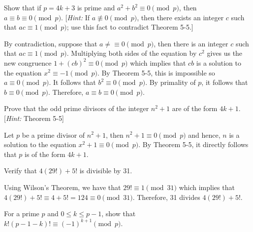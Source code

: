 \begin{exercise}
    Show that if $p = 4k + 3$ is prime and $a^2 + b^2 \equiv 0 \pmod p$, then $a\equiv b \equiv 0 \pmod p$. [\textit{Hint:} If $a \not\equiv 0 \pmod p$, then there exists an integer $c$ such that $ac \equiv 1 \pmod p$; use this fact to contradict Theorem 5-5.] \\
\end{exercise}

\begin{solution}
    By contradiction, suppose that $a\neq\equiv 0 \pmod{p}$, then there is an integer $c$ such that $ac \equiv 1 \pmod{p}$. Multiplying both sides of the equation by $c^2$ gives us the new congruence $1 + (cb)^2 \equiv 0 \pmod{p}$ which implies that $cb$ is a solution to the equation $x^2 \equiv -1 \pmod{p}$. By Theorem 5-5, this is impossible so $a \equiv 0 \pmod p$. It follows that $b^2 \equiv 0 \pmod p$. By primality of $p$, it follows that $b \equiv 0 \pmod p$. Therefore, $a\equiv b \equiv 0 \pmod p$. \\
\end{solution}

\begin{exercise}
    Prove that the odd prime divisors of the integer $n^2 + 1$ are of the form $4k+1$. [\textit{Hint:} Theorem 5-5] \\
\end{exercise}

\begin{solution}
    Let $p$ be a prime divisor of $n^2 + 1$, then $n^2 + 1 \equiv 0 \pmod p$ and hence, $n$ is a solution to the equation $x^2 + 1 \equiv 0 \pmod p$. By Theorem 5-5, it directly follows that $p$ is of the form $4k+1$. \\
\end{solution}

\begin{exercise}
    Verify that $4(29!) + 5!$ is divisible by 31. \\
\end{exercise}

\begin{solution}
    Using Wilson's Theorem, we have that $29! \equiv 1 \pmod{31}$ which implies that $4(29!) + 5! \equiv 4 + 5! = 124 \equiv 0 \pmod{31}$. Therefore, 31 divides $4(29!) + 5!$. \\
\end{solution}

\begin{exercise}
    For a prime $p$ and $0 \leq k \leq p-1$, show that $k!(p-1-k)! \equiv (-1)^{k+1} \pmod{p}$. \\
\end{exercise}

